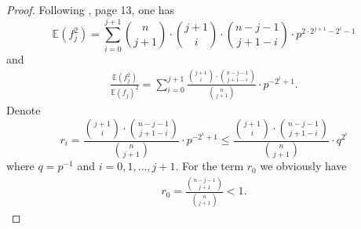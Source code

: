 \documentclass[10pt,a4paper]{amsart}
\begin{document}
\begin{proof} 
%
 
Following \cite{FM}, page 13, one has
$$
\mathbb E(f^2_j)= \sum_{i=0}^{j+1}\binom n {j+1}\cdot \binom {j+1}{i} \cdot \binom {n-j-1}{j+1-i}\cdot p^{2\cdot 2^{j+1}-2^i-1}
$$
and 
\begin{eqnarray*}\label{eq:30}
\frac{\mathbb E(f^2_j)}{\mathbb E(f_j)^2}= \sum_{i=0}^{j+1}\frac{\binom {j+1}{i} \cdot \binom {n-j-1}{j+1-i}}{\binom n {j+1}}\cdot p^{-2^i+1}.
\end{eqnarray*}
Denote 
$$
r_i= \frac{\binom {j+1}{i} \cdot \binom {n-j-1}{j+1-i}}{\binom n {j+1}}\cdot p^{-2^i+1}\le \frac{\binom {j+1}{i} \cdot \binom {n-j-1}{j+1-i}}{\binom n {j+1}}\cdot q^{2^i}
$$
where $q=p^{-1}$ and $ i=0, 1, \dots, j+1.$
For the term $r_0$ we obviously have
\begin{eqnarray*}\label{eq:r0}
r_0= \frac{\binom {n-j-1}{j+1}}{{\binom{n} {j+1}}}<1.
\end{eqnarray*}


\end{proof}
\end{document}
